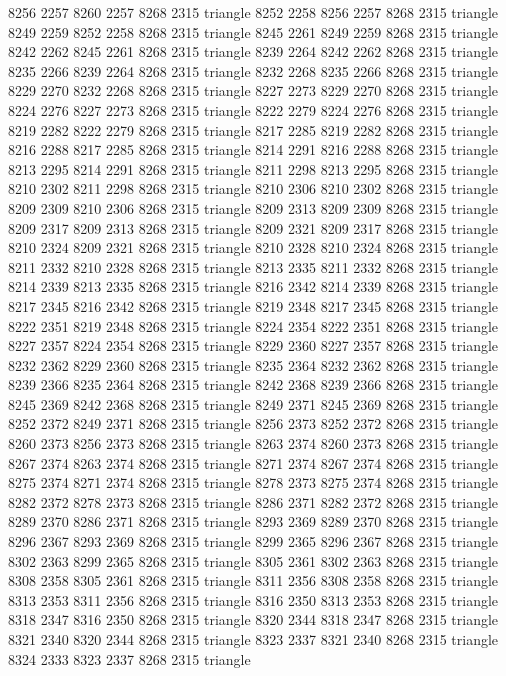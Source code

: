 8256 2257 8260 2257 8268 2315 triangle
8252 2258 8256 2257 8268 2315 triangle
8249 2259 8252 2258 8268 2315 triangle
8245 2261 8249 2259 8268 2315 triangle
8242 2262 8245 2261 8268 2315 triangle
8239 2264 8242 2262 8268 2315 triangle
8235 2266 8239 2264 8268 2315 triangle
8232 2268 8235 2266 8268 2315 triangle
8229 2270 8232 2268 8268 2315 triangle
8227 2273 8229 2270 8268 2315 triangle
8224 2276 8227 2273 8268 2315 triangle
8222 2279 8224 2276 8268 2315 triangle
8219 2282 8222 2279 8268 2315 triangle
8217 2285 8219 2282 8268 2315 triangle
8216 2288 8217 2285 8268 2315 triangle
8214 2291 8216 2288 8268 2315 triangle
8213 2295 8214 2291 8268 2315 triangle
8211 2298 8213 2295 8268 2315 triangle
8210 2302 8211 2298 8268 2315 triangle
8210 2306 8210 2302 8268 2315 triangle
8209 2309 8210 2306 8268 2315 triangle
8209 2313 8209 2309 8268 2315 triangle
8209 2317 8209 2313 8268 2315 triangle
8209 2321 8209 2317 8268 2315 triangle
8210 2324 8209 2321 8268 2315 triangle
8210 2328 8210 2324 8268 2315 triangle
8211 2332 8210 2328 8268 2315 triangle
8213 2335 8211 2332 8268 2315 triangle
8214 2339 8213 2335 8268 2315 triangle
8216 2342 8214 2339 8268 2315 triangle
8217 2345 8216 2342 8268 2315 triangle
8219 2348 8217 2345 8268 2315 triangle
8222 2351 8219 2348 8268 2315 triangle
8224 2354 8222 2351 8268 2315 triangle
8227 2357 8224 2354 8268 2315 triangle
8229 2360 8227 2357 8268 2315 triangle
8232 2362 8229 2360 8268 2315 triangle
8235 2364 8232 2362 8268 2315 triangle
8239 2366 8235 2364 8268 2315 triangle
8242 2368 8239 2366 8268 2315 triangle
8245 2369 8242 2368 8268 2315 triangle
8249 2371 8245 2369 8268 2315 triangle
8252 2372 8249 2371 8268 2315 triangle
8256 2373 8252 2372 8268 2315 triangle
8260 2373 8256 2373 8268 2315 triangle
8263 2374 8260 2373 8268 2315 triangle
8267 2374 8263 2374 8268 2315 triangle
8271 2374 8267 2374 8268 2315 triangle
8275 2374 8271 2374 8268 2315 triangle
8278 2373 8275 2374 8268 2315 triangle
8282 2372 8278 2373 8268 2315 triangle
8286 2371 8282 2372 8268 2315 triangle
8289 2370 8286 2371 8268 2315 triangle
8293 2369 8289 2370 8268 2315 triangle
8296 2367 8293 2369 8268 2315 triangle
8299 2365 8296 2367 8268 2315 triangle
8302 2363 8299 2365 8268 2315 triangle
8305 2361 8302 2363 8268 2315 triangle
8308 2358 8305 2361 8268 2315 triangle
8311 2356 8308 2358 8268 2315 triangle
8313 2353 8311 2356 8268 2315 triangle
8316 2350 8313 2353 8268 2315 triangle
8318 2347 8316 2350 8268 2315 triangle
8320 2344 8318 2347 8268 2315 triangle
8321 2340 8320 2344 8268 2315 triangle
8323 2337 8321 2340 8268 2315 triangle
8324 2333 8323 2337 8268 2315 triangle
